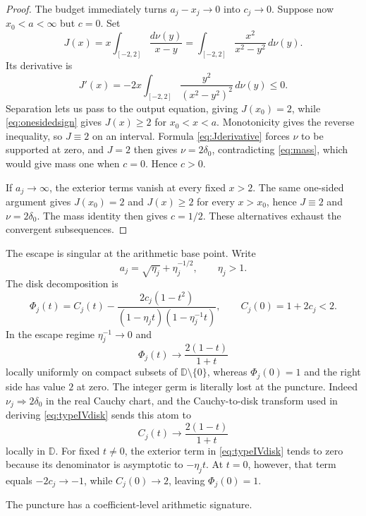 \documentclass[11pt,reqno]{amsart}
\theoremstyle{definition}
\theoremstyle{remark}
\newcommand{\D}{\mathbb D}
\begin{document}
\begin{proof}
The budget immediately turns $a_j-x_j\to0$ into $c_j\to0$.  Suppose now
$x_0<a<\infty$ but $c=0$.  Set
\[
 J(x)=x\int_{[-2,2]}\frac{d\nu(y)}{x-y}
 =\int_{[-2,2]}\frac{x^2}{x^2-y^2}\,d\nu(y).
\]
Its derivative is
\begin{equation}\label{eq:Jderivative}
 J'(x)=-2x\int_{[-2,2]}\frac{y^2}{(x^2-y^2)^2}\,d\nu(y)\le0.
\end{equation}
Separation lets us pass to the output
equation, giving $J(x_0)=2$, while \eqref{eq:onesidedsign} gives
$J(x)\ge2$ for $x_0<x<a$.  Monotonicity gives the reverse inequality, so
$J\equiv2$ on an interval.  Formula \eqref{eq:Jderivative} forces
$\nu$ to be supported at zero, and $J=2$ then gives $\nu=2\delta_0$,
contradicting
\eqref{eq:mass}, which would give mass one when $c=0$.  Hence $c>0$.

If $a_j\to\infty$, the exterior terms vanish at every fixed $x>2$.
The same one-sided argument gives $J(x_0)=2$ and $J(x)\ge2$ for every
$x>x_0$, hence $J\equiv2$ and $\nu=2\delta_0$.  The mass identity then gives
$c=1/2$.  These alternatives exhaust the convergent subsequences.
\end{proof}

The escape is singular at the arithmetic base point.  Write
\[
 a_j=\sqrt{\eta_j}+\eta_j^{-1/2},\qquad \eta_j>1.
\]
The disk decomposition is
\begin{equation}\label{eq:typeIVdisk}
 \Phi_j(t)=C_j(t)-
 \frac{2c_j(1-t^2)}
 {(1-\eta_jt)(1-\eta_j^{-1}t)},\qquad
 C_j(0)=1+2c_j<2.
\end{equation}
In the escape regime $\eta_j^{-1}\to0$ and
\begin{equation}\label{eq:puncturedlimit}
 \Phi_j(t)\longrightarrow\frac{2(1-t)}{1+t}
\end{equation}
locally uniformly on compact subsets of $\D\setminus\{0\}$,
whereas $\Phi_j(0)=1$ and the right side has value $2$ at zero.  The integer
germ is literally lost at the puncture.  Indeed
$\nu_j\Rightarrow2\delta_0$ in the real Cauchy chart, and the
Cauchy-to-disk transform used in deriving \eqref{eq:typeIVdisk} sends this
atom to
\[
 C_j(t)\longrightarrow\frac{2(1-t)}{1+t}
\]
locally in $\D$.  For fixed $t\ne0$, the exterior term in
\eqref{eq:typeIVdisk} tends to zero because its denominator is asymptotic to
$-\eta_jt$.  At $t=0$, however, that term equals $-2c_j\to-1$, while
$C_j(0)\to2$, leaving $\Phi_j(0)=1$.

The puncture has a coefficient-level arithmetic signature.
\end{document}
